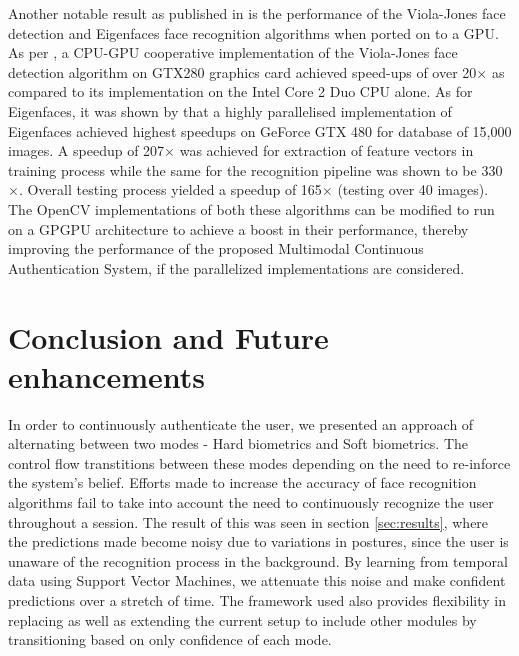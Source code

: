 \documentclass[%
        final,
        notitlepage,
        narroweqnarray,
        inline,
        ]{ieee}
\begin{document}
Another notable result as published in \cite{fdetGPU,cudafrec} is the performance of the Viola-Jones face detection and Eigenfaces face recognition algorithms when ported on to a GPU. As per \cite{fdetGPU}, a CPU-GPU cooperative implementation of the Viola-Jones face detection algorithm on GTX280 graphics card achieved speed-ups of over 20$\times$ as compared to its implementation on the Intel Core 2 Duo CPU alone. As for Eigenfaces, it was shown by \cite{cudafrec} that a highly parallelised implementation of Eigenfaces achieved highest speedups on GeForce GTX 480 for database of 15,000 images. A speedup of 207$\times$ was achieved for extraction of feature vectors in training process while the same for the recognition pipeline was shown to be 330$\times$. Overall testing process yielded a speedup of 165$\times$ (testing over 40 images). The OpenCV implementations of both these algorithms can be modified to run on a GPGPU architecture to achieve a boost in their performance, thereby improving the performance of the proposed Multimodal Continuous Authentication System, if the parallelized implementations are considered. 

\section{Conclusion and Future enhancements} \label{sec:conclusion}
In order to continuously authenticate the user, we presented an approach of alternating between two modes - Hard biometrics and Soft biometrics.
The control flow transtitions between these modes depending on the need to re-inforce the system's belief.
Efforts made to increase the accuracy of face recognition algorithms fail to take into account the need to continuously recognize the user throughout a session.
The result of this was seen in section \ref{sec:results}, where the predictions made become noisy due to variations in postures, since the user is unaware of the recognition process in the background.
By learning from temporal data using Support Vector Machines, we attenuate this noise and make confident predictions over a stretch of time.
The framework used also provides flexibility in replacing as well as extending the current setup to include other modules by transitioning based on only confidence of each mode.
\end{document}
